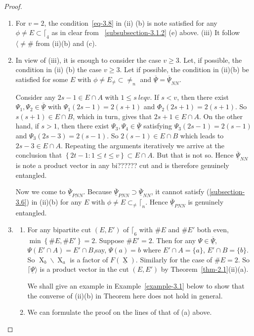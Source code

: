 \documentclass[a4paper,12pt]{article}
\DeclareMathOperator{\x}{\mathrm{X}}
\theoremstyle{definition}
\theoremstyle{underlinethm}
\theoremstyle{underline}
\begin{document}
\begin{proof}
\begin{enumerate}[label=(\roman*)]
\item For $v=2$, the condition~\ref{eq-3.8}   in (ii) (b) is note satisfied for any $\phi \neq E \subset \lceil_{4}$ as in clear from ~\ref{subsubsection-3.1.2} (e) above. (iii) It follow $\langle \neq \#$ from (ii)(b) and (c).

\item In view of (iii), it is enough to consider the case $v \geq 3$. Let, if possible, the condition in (ii) (b) the case $v \geq 3$. Let if possible, the condition in (ii)(b) be satisfied for some $E$ with $\phi \neq E_{\neq} \subset \neq_{n}$ and $\underline{\overline{\Psi}}= \underline{\overline{\Psi}}_{NN}$.

Consider any $2s-1 \in E \cap A$ with $1 \leq s\ leq v$. If $s < v$, then there exist $\Psi_{1}, \Psi_{2} \in \underline{\overline{\Psi}}$ with $\Psi_{1} (2s-1) = 2(s + 1)$ and $\Phi_{2} (2s+1) = 2(s+ 1)$. So $s(s+ 1) \in E \cap B$, which in turn, gives that $2s+1 \in E \cap A$. On the other hand, if $s > 1$, then there exist $\Psi_{3}, \Psi_{4} \in \underline{\overline{\Psi}}$ satisfying $\Psi_{3}(2s-1)= 2(s-1)$ and $\Psi_{3}(2s-3) =2 (s-1)$. So $2(s-1) \in E \cap B$ which leads to $2s-3 \in E \cap A$. Repeating the arguments iteratively we arrive at the conclusion that $\left\{2t-1 : 1 \leq t \leq v \right\} \subset E \cap A$. But that is not so. Hence $\underline{\overline{\Psi}}_{NN}$ is note a product vector in any bi?????? cut and is therefore genuinely entangled.  

Now we come to $\underline{\overline{\Psi}}_{PNN}$. Because $\underline{\overline{\Psi}}_{PNN} \supset \underline{\overline{\Psi}}_{NN}$, it cannot satisfy (\ref{subsection-3.6}) in (ii)(b) for any $E$ with $\phi \neq E \subset_{\neq} \lceil_{n}$. Hence $\underline{\overline{\Psi}}_{PNN}$ is genuinely entangled.

\item 
\begin{enumerate}[label=(\alph*)]
\item For any bipartite cut $(E, E')$ of $\lceil_{6}$ with $\#E$ and $\#E'$ both even,\break $\min\left\{\# E, \# E'\right\}=2$. Suppose $\#E'=2$. Then for any $\Psi \in \underline{\overline{\Psi}}$, $\Psi (E' \cap A) = E' \cap B$,say, $\Psi(a) = b$ where $E'\cap A = \{a\}$, $E'\cap B=\{b\}$. So $\x_{b} \smallsetminus \x_{a}$ is a factor of $F(\underline{\x})$. Similarly for the case of $\# E=2$. So $\lceil\underline{\Psi}\rangle$ is a product vector in the cut $(E, E')$ by Theorem~\ref{thm-2.1}(ii)(a).

We shall give an example in Example~\ref{example-3.1} below to show that the converse of (ii)(b) in Theorem here does not hold in general.

\item We can formulate the proof on the lines of that of (a) above.

\end{enumerate}

\end{enumerate}

\end{proof}
\end{document}
